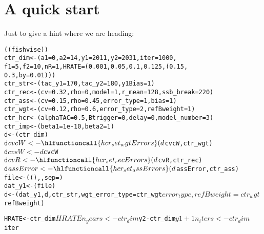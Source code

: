 \documentclass[a4paper]{article}
\begin{document}
\section{A quick start}
Just to give a hint where we are heading:
\begin{knitrout}
\color{fgcolor}\begin{kframe}
\begin{alltt}
((fishvise))
ctr_dim <- (a1 = 0, a2 = 14, y1 = 2011, y2 = 2031, iter = 1000, 
    f1 = 5, f2 = 10, nR = 1, HRATE = (0.001, 0.05, 0.1, 0.125, (0.15, 
        0.3, by = 0.01)))
ctr_str <- (tac_y1 = 170, tac_y2 = 180, y1Bias = 1)
ctr_rec <- (cv = 0.32, rho = 0, model = 1, r_mean = 128, ssb_break = 220)
ctr_ass <- (cv = 0.15, rho = 0.45, error_type = 1, bias = 1)
ctr_wgt <- (cv = 0.12, rho = 0.6, error_type = 2, refBweight = 1)
ctr_hcr <- (alphaTAC = 0.5, Btrigger = 0, delay = 0, model_number = 3)
ctr_imp <- (beta1 = 1e-10, beta2 = 1)
d <- (ctr_dim)
d$cvcW <- \hlfunctioncall{hcr_set_wgtErrors}(d$cvcW, ctr_wgt)
d$cvsW <- d$cvcW
d$cvR <- \hlfunctioncall{hcr_set_recErrors}(d$cvR, ctr_rec)
d$assError <- \hlfunctioncall{hcr_set_assErrors}(d$assError, ctr_ass)
file <- ((), , sep = )
dat_y1 <- (file)
d <- (dat_y1, d, ctr_str, wgt_error_type = ctr_wgt$error_type, 
    refBweight = ctr_wgt$refBweight)

HRATE <- ctr_dim$HRATE
n_years <- ctr_dim$y2 - ctr_dim$y1 + 1
n_iters <- ctr_dim$iter
\end{alltt}
\end{kframe}
\end{knitrout}
\end{document}
